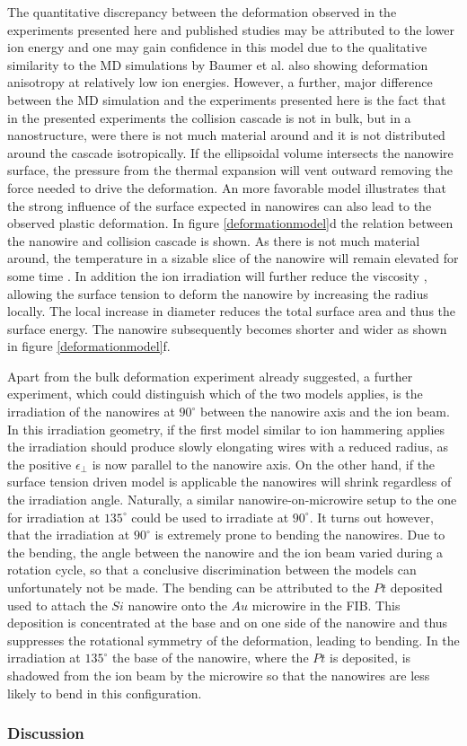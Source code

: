 The quantitative discrepancy between the deformation observed in the experiments presented here and published studies may be attributed to the lower ion energy and one may gain confidence in this model due to the qualitative similarity to the MD simulations by Baumer et al. \cite{baumer_prediction_2014} also showing deformation anisotropy at relatively low ion energies. However, a further, major difference between the MD simulation and the experiments presented here is the fact that in the presented experiments the collision cascade is not in bulk, but in a nanostructure, were there is not much material around and it is not distributed around the cascade isotropically. If the ellipsoidal volume intersects the nanowire surface, the pressure from the thermal expansion will vent outward removing the force needed to drive the deformation. An more favorable model illustrates that the strong influence of the surface expected in nanowires can also lead to the observed plastic deformation. In figure \ref{deformationmodel}d the relation between the nanowire and collision cascade is shown. As there is not much material around, the temperature in a sizable slice of the nanowire will remain elevated for some time \cite{borschel_ion-solid_2012,greaves_enhanced_2013,anders_sputtering_2015,johannes_ion_2015}. In addition the ion irradiation will further reduce the viscosity \cite{snoeks_stress_1997,hu_burrowing_2002,mayr_mechanisms_2003}, allowing the surface tension to deform the nanowire by increasing the radius locally. The local increase in diameter reduces the total surface area and thus the surface energy. The nanowire subsequently becomes shorter and wider as shown in figure \ref{deformationmodel}f. 

Apart from the bulk deformation experiment already suggested, a further experiment, which could distinguish which of the two models applies, is the irradiation of the nanowires at $90^\circ$ between the nanowire axis and the ion beam. In this irradiation geometry, if the first model similar to ion hammering applies the irradiation should produce slowly elongating wires with a reduced radius, as the positive $\epsilon_{\perp}$ is now parallel to the nanowire axis. On the other hand, if the surface tension driven model is applicable the nanowires will shrink regardless of the irradiation angle. Naturally, a similar nanowire-on-microwire setup to the one for irradiation at $135^\circ$ could be used to irradiate at $90^\circ$. It turns out however, that the irradiation at $90^\circ$ is extremely prone to bending the nanowires. Due to the bending, the angle between the nanowire and the ion beam varied during a rotation cycle, so that a conclusive discrimination between the models can unfortunately not be made. The bending can be attributed to the $Pt$ deposited used to attach the $Si$ nanowire onto the $Au$ microwire in the FIB. This deposition is concentrated at the base and on one side of the nanowire and thus suppresses the rotational symmetry of the deformation, leading to bending. In the irradiation at $135^\circ$ the base of the nanowire, where the $Pt$ is deposited, is shadowed from the ion beam by the microwire so that the nanowires are less likely to bend in this configuration. 


\subsubsection{Discussion}